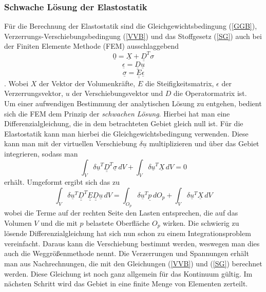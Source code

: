 \subsubsection{Schwache Lösung der Elastostatik}
Für die Berechnung der Elastostatik sind die Gleichgewichtsbedingung (\ref{GGB}),  Verzerrungs-Verschiebungsbedingung (\ref{VVB}) und das Stoffgesetz (\ref{SG}) auch bei der Finiten Elemente Methode (FEM) ausschlaggebend
\begin{equation}\label{GGB}
	\underline{0} = \underline{X} + \underline{\underline{D}}^T \sigma 
\end{equation}
\begin{equation}\label{VVB}
	\underline{\epsilon} = \underline{\underline{D}} \underline{u}
\end{equation}
\begin{equation}\label{SG}
	\underline{\sigma} = \underline{\underline{E}} \underline{\epsilon}
\end{equation}
\cite{item14}. Wobei \underline{$X$} der Vektor der Volumenkräfte, \underline{\underline{$E$}} die Steifigkeitsmatrix, \underline{$\epsilon$} der Verzerrungsvektor, \underline{$u$} der Verschiebungsvektor und \underline{\underline{$D$}} die Operatormatrix ist.\\
Um einer aufwendigen Bestimmung der analytischen Lösung zu entgehen, bedient sich die FEM dem Prinzip der \textit{schwachen Lösung}. Hierbei hat man eine Differenzialgleichung, die in dem betrachteten Gebiet gleich null ist. Für die Elastostatik kann man hierbei die Gleichgewichtsbedingung verwenden. Diese kann man mit der virtuellen Verschiebung $\delta\underline{u}$ multiplizieren und über das Gebiet integrieren, sodass man
\begin{equation}
	\int_{V}^{}\delta\underline{u}^T\underline{\underline{D}}^T\underline{\sigma}\,dV + \int_{V}^{}\delta\underline{u}^T\underline{X}\,dV = 0
\end{equation}
erhält. Umgeformt ergibt sich das zu
\begin{equation}\label{SL}
	\int_{V}^{}\delta\underline{u}^T\underline{\underline{D}}^T\underline{\underline{E}}\underline{\underline{D}}\underline{u}\,dV = \int_{O_{p}}^{}\delta\underline{u}^T\underline{p}\,dO_p + \int_{V}^{}\delta\underline{u}^T\underline{X}\,dV
\end{equation}
wobei die Terme auf der rechten Seite den Lasten entsprechen, die auf das Volumen $V$ und die mit $p$ belastete Oberfläche $O_{p}$ wirken. Die schwierig zu lösende Differenzialgleichung hat sich nun schon zu einem Integrationsproblem vereinfacht. Daraus kann die Verschiebung bestimmt werden, weswegen man dies auch die Weggrößenmethode nennt. Die Verzerrungen und Spannungen erhält man aus Nachrechnungen, die mit den Gleichungen (\ref{VVB}) und (\ref{SG}) berechnet werden. Diese Gleichung ist noch ganz allgemein für das Kontinuum gültig. Im nächsten Schritt wird das Gebiet in eine finite Menge von Elementen zerteilt.

